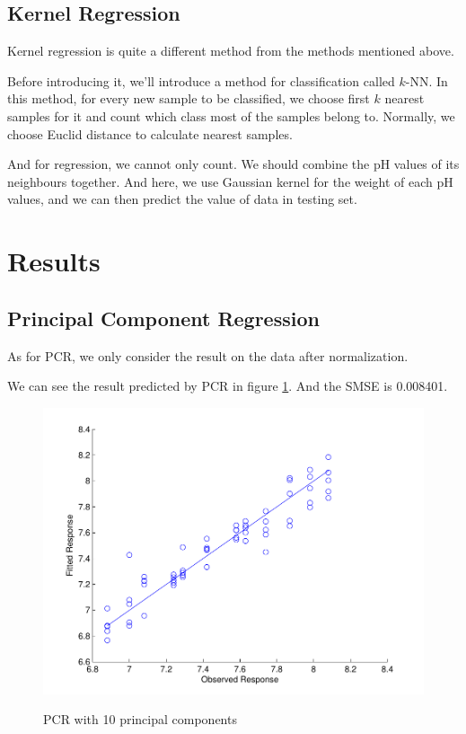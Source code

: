 \documentclass[a4paper]{article}
\begin{document}
\subsection{Kernel Regression}
Kernel regression is quite a different method from the methods mentioned above.

Before introducing it, we'll introduce a method for classification called $k$-NN. In this method, for every new sample to be classified, we choose first $k$ nearest samples for it and count which class most of the samples belong to. Normally, we choose Euclid distance to calculate nearest samples.

And for regression, we cannot only count. We should combine the pH values of its neighbours together. And here, we use Gaussian kernel for the weight of each pH values, and we can then predict the value of data in testing set.

\section{Results}
\subsection{Principal Component Regression}
As for PCR, we only consider the result on the data after normalization. 

We can see the result predicted by PCR in figure \ref{pic4}. And the SMSE is 0.008401.
\begin{figure}[h]
  \centering
  \includegraphics[width=.6\textwidth]{images/predpcr10smse008401.pdf}\\
  \caption{PCR with 10 principal components}\label{pic4}
\end{figure}
\end{document}
